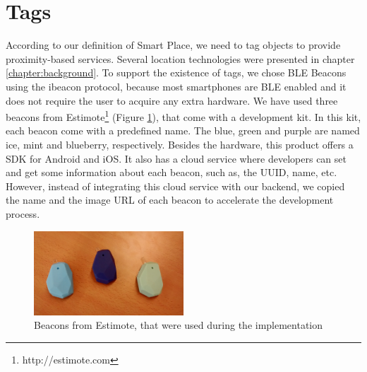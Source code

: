 \section{Tags}
\label{sec:implementation_tags}
According to our definition of Smart Place, we need to tag objects to provide proximity-based services.
Several location technologies were presented in chapter \ref{chapter:background}.
To support the existence of tags, we chose \gls{BLE} Beacons using the ibeacon protocol, because most smartphones are \gls{BLE} enabled and it does not require the user to acquire any extra hardware.
We have used three beacons from Estimote\footnote{http://estimote.com}
(Figure \ref{fig:estimote}), that come with a development kit.
In this kit, each beacon come with a predefined name.
The blue, green and purple are named ice, mint and blueberry, respectively.
Besides the hardware, this product offers a \gls{SDK} for Android and
iOS. It also has a cloud service where developers can set and get
some information about each beacon, such as, the \gls{UUID}, name, etc.
However, instead of integrating this cloud service with our backend, we copied the name and the image \gls{URL} of each beacon to accelerate the development process.

\begin{figure}[!ht]
  \centering
    \includegraphics[width=0.5\textwidth, keepaspectratio]{images/estimote}
    \caption[Estimote beacons]{Beacons from Estimote, that were used during the implementation}
    \label{fig:estimote}
\end{figure}

